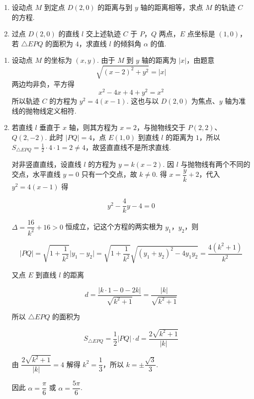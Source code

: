 \begin{problem}
\begin{enumerate}
\item 设动点 \(M\) 到定点 \(D(2,0) \) 的距离与到 \(y\) 轴的距离相等，求点 \(M\) 的轨迹 \(C\) 的方程.
\item 过点 \(D(2,0)\) 的直线 \(l\) 交上述轨迹 \(C\) 于 \(P\)，\(Q\) 两点，\(E\) 点坐标是 \((1,0)\)，若 \(\triangle EPQ\) 的面积为 \(4\)，求直线 \(l\) 的倾斜角 \(\alpha\) 的值.
\end{enumerate}
\end{problem}

\begin{solution}
\begin{enumerate}
\item 设动点 \(M\) 的坐标为 \((x,y)\). 由于 \(M\) 到 \(y\) 轴的距离为 \(\lvert x\rvert\)，由题意
\[
\sqrt{(x-2)^2+y^2}=\lvert x\rvert
\]
两边均非负，平方得
\[
x^2-4x+4+y^2=x^2
\]
所以轨迹 \(C\) 的方程为 \(y^2=4(x-1)\). 这也与以 \(D(2,0)\) 为焦点、\(y\) 轴为准线的抛物线定义相符.

\item

若直线 \(l\) 垂直于 \(x\) 轴，则其方程为 \(x=2\)，与抛物线交于 \(P(2,2)\)、\(Q(2,-2)\). 此时 \(\lvert PQ\rvert=4\)，点 \(E(1,0)\) 到直线 \(l\) 的距离为 \(1\)，所以 \(S_{\triangle EPQ}=\frac12\cdot4\cdot1=2\ne4\)，故竖直直线不是所求直线.

对非竖直直线，设直线 \(l\) 的方程为 \(y=k(x-2)\). 因 \(l\) 与抛物线有两个不同的交点，水平直线 \(y=0\) 只有一个交点，故 \(k\ne0\). 得 \(x=\dfrac{y}{k}+2\)，代入 \(y^2=4(x-1)\) 得

\[
y^2-\frac{4}{k}y-4=0
\]

\(\Delta=\dfrac{16}{k^2}+16>0\) 恒成立，记这个方程的两实根为 \(y_1\)，\(y_2\)，则

\[
\lvert PQ\rvert=\sqrt{1+\frac{1}{k^2}}\lvert y_1-y_2\rvert=\sqrt{1+\frac{1}{k^2}}\sqrt{(y_1+y_2)^2-4y_1y_2}=\frac{4(k^2+1)}{k^2}
\]

又点 \(E\) 到直线 \(l\) 的距离

\[
d=\frac{\lvert k\cdot1-0-2k\rvert}{\sqrt{k^2+1}}=\frac{\lvert k\rvert}{\sqrt{k^2+1}}
\]

所以 \(\triangle EPQ\) 的面积为

\[
S_{\triangle EPQ}=\frac{1}{2}\lvert PQ\rvert\cdot d=\frac{2\sqrt{k^2+1}}{\lvert k\rvert}
\]

由 \(\dfrac{2\sqrt{k^2+1}}{\lvert k\rvert}=4\) 解得 \(k^2=\dfrac{1}{3}\)，所以 \(k=\pm\dfrac{\sqrt{3}}{3}\).

因此 \(\alpha=\dfrac{\pi}{6}\) 或 \(\alpha=\dfrac{5\pi}{6}\).

\end{enumerate}
\end{solution}

